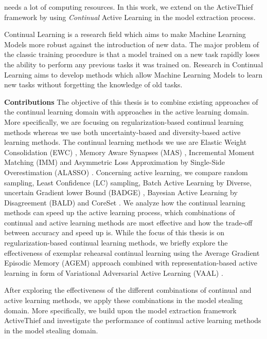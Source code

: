 needs a lot of computing resources. In this work, we extend on the ActiveThief framework by using \textit{Continual} Active Learning in the model
extraction process.\par
Continual Learning is a research field which aims to make Machine Learning Models more robust against the introduction of new data. The major problem
of the classic training procedure is that a model trained on a new task rapidly loses the ability to perform any previous tasks it was trained on.
Research in Continual Learning aims to develop methods which allow Machine Learning Models to learn new tasks without forgetting the knowledge of old 
tasks. \par
\textbf{Contributions} \hspace{0.2cm} The objective of this thesis is to combine existing approaches of the continual learning domain
 with approaches in the active learning domain. More specifically, we are focusing on regularization-based continual learning methods
whereas we use both uncertainty-based and diversity-based active learning methods. The continual learning methods we use are Elastic
Weight Consolidation (EWC) \cite{kirkpatrick2017overcoming}, Memory Aware Synapses (MAS) \cite{aljundi2018memory}, Incremental Moment Matching
(IMM) \cite{lee2017overcoming} and Asymmetric Loss Approximation by Single-Side Overestimation (ALASSO) \cite{park2019continual}.
Concerning active learning, we compare random sampling, Least Confidence (LC) \cite{lewis1994sequential} sampling, Batch Active Learning by
Diverse, uncertain Gradient lower Bound (BADGE) \cite{ash2019deep}, Bayesian Active Learning by Disagreement (BALD) \cite{houlsby2011bayesian} and
CoreSet \cite{sener2017active}.
We analyze how the continual learning methods can speed up the active learning process, which combinations of continual and active learning methods
are most effective and how the trade-off between accuracy and speed up is. While the focus of this thesis is on regularization-based continual
learning methods, we briefly explore the effectiveness of exemplar rehearsal continual learning using the Average Gradient Episodic Memory (AGEM)
approach \cite{chaudhry2018efficient} combined with representation-based active learning in form of Variational Adversarial Active Learning (VAAL)
\cite{sinha2019variational}. \par
After exploring the effectiveness of the different combinations of continual and active learning methods, we apply these combinations in the model stealing
domain. More specifically, we build upon the model extraction framework ActiveThief \cite{pal2020activethief} and investigate the performance of continual
active learning methods in the model stealing domain.

